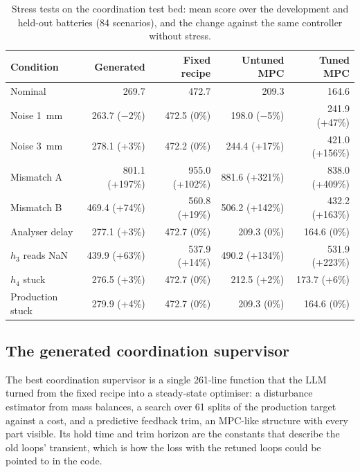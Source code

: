 \begin{table}[tb]
  \centering
  \caption{Stress tests on the coordination test bed: mean score over the
    development and held-out batteries (84 scenarios), and the change against
    the same controller without stress.}
  \label{tab:coord-stress}
  \small\setlength{\tabcolsep}{3pt}
  \begin{tabular}{@{}lrrrr@{}}
    \toprule
    Condition & Generated & Fixed recipe & Untuned MPC & Tuned MPC \\
    \midrule
    Nominal             & 269.7          & 472.7          & 209.3          & 164.6 \\
    Noise 1~mm          & 263.7 ($-$2\%)   & 472.5 (0\%)    & 198.0 ($-$5\%)   & 241.9 (+47\%) \\
    Noise 3~mm          & 278.1 (+3\%)   & 472.2 (0\%)    & 244.4 (+17\%)  & 421.0 (+156\%) \\
    Mismatch A          & 801.1 (+197\%) & 955.0 (+102\%) & 881.6 (+321\%) & 838.0 (+409\%) \\
    Mismatch B          & 469.4 (+74\%)  & 560.8 (+19\%)  & 506.2 (+142\%) & 432.2 (+163\%) \\
    Analyser delay      & 277.1 (+3\%)   & 472.7 (0\%)    & 209.3 (0\%)    & 164.6 (0\%) \\
    $h_3$ reads NaN     & 439.9 (+63\%)  & 537.9 (+14\%)  & 490.2 (+134\%) & 531.9 (+223\%) \\
    $h_4$ stuck         & 276.5 (+3\%)   & 472.7 (0\%)    & 212.5 (+2\%)   & 173.7 (+6\%) \\
    Production stuck    & 279.9 (+4\%)   & 472.7 (0\%)    & 209.3 (0\%)    & 164.6 (0\%) \\
    \bottomrule
  \end{tabular}
\end{table}

\subsection{The generated coordination supervisor}
\label{sec:coord-champion}
The best coordination supervisor is a single 261-line function that the LLM
turned from the fixed recipe into a steady-state optimiser: a disturbance
estimator from mass balances, a search over 61 splits of the production target
against a cost, and a predictive feedback trim, an MPC-like structure with
every part visible. Its hold time and trim horizon are the constants that
describe the old loops' transient, which is how the loss with the retuned
loops could be pointed to in the code.

